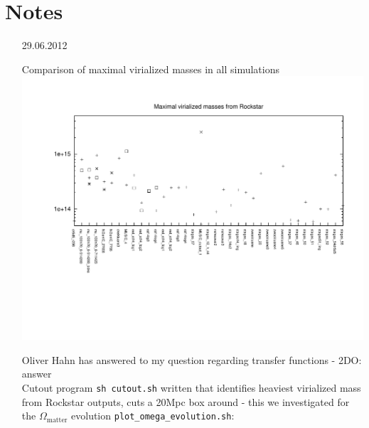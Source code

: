 
\chapter{Notes}
\begin{itemize}


\item[29.06.2012]

Comparison of maximal virialized masses in all simulations \\

\includegraphics[scale=0.45]{analysis/omega_evolution/comparison_mvirmax.pdf}

Oliver Hahn has answered to my question regarding transfer functions - 2DO: answer \\
Cutout program \texttt{sh cutout.sh} written that identifies heaviest virialized mass 
from Rockstar outputs, cuts a 20Mpc box around -  this we investigated 
for the $ \Omega_{\text{matter}}$ evolution \texttt{plot\_omega\_evolution.sh}: 


\end{itemize}
